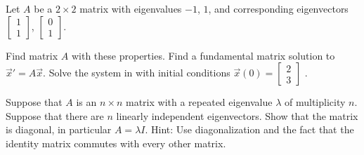 \documentclass{ximera}
\begin{document}
\begin{exercise}
    Let $A$ be a $2 \times 2$ matrix with eigenvalues $-1$, $1$, and corresponding eigenvectors
    $\left[ 
        \begin{smallmatrix}
            1 \\
            1
        \end{smallmatrix} 
    \right]$,
    $\left[ 
        \begin{smallmatrix}
            0 \\
            1
        \end{smallmatrix} 
    \right]$.
    \begin{tasks}
        \task Find matrix $A$ with these properties.
        \task Find a fundamental matrix solution to ${\vec{x}}' = A \vec{x}$.
        \task Solve the system in with initial conditions $\vec{x}(0) =
        \left[ 
            \begin{smallmatrix}
                2 \\
                3
            \end{smallmatrix} 
        \right]$ .
    \end{tasks}
\end{exercise}

\begin{exercise}
    Suppose that $A$ is an $n \times n$ matrix with a repeated eigenvalue $\lambda$ of multiplicity $n$. Suppose that there are $n$ linearly independent eigenvectors.  Show that the matrix is diagonal, in particular $A = \lambda I$.  Hint: Use diagonalization and the fact that the identity matrix commutes with every other matrix.
\end{exercise}
\end{document}
